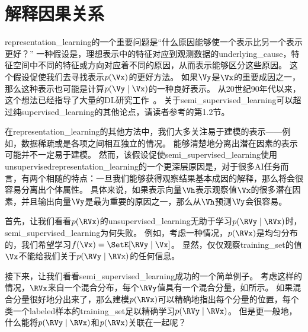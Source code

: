 
\section{解释因果关系}
\label{sec:semi_supervised_disentangling_of_causal_factors}


\gls{representation_learning}的一个重要问题是``什么原因能够使一个表示比另一个表示更好？''
一种假设是，理想表示中的特征对应到观测数据的\gls{underlying_cause}，特征空间中不同的特征或方向对应着不同的原因，从而表示能够区分这些原因。
这个假设促使我们去寻找表示$p(\Vx)$的更好方法。
如果$\Vy$是$\Vx$的重要成因之一，那么这种表示也可能是计算$p(\Vy \mid \Vx)$的一种良好表示。
从20世纪90年代以来，这个想法已经指导了大量的\gls{DL}研究工作~\citep{Becker92,hinton1999unsupervised}。
关于\gls{semi_supervised_learning}可以超过纯\gls{supervised_learning}的其他论点，请读者参考\cite{Chapelle-2006}的第1.2节。


在\gls{representation_learning}的其他方法中，我们大多关注易于建模的表示——例如，数据稀疏或是各项之间相互独立的情况。
能够清楚地分离出潜在因素的表示可能并不一定易于建模。
然而，该假设促使\gls{semi_supervised_learning}使用\gls{unsupervised}\gls{representation_learning}的一个更深层原因是，对于很多\gls{AI}任务而言，有两个相随的特点：一旦我们能够获得观察结果基本成因的解释，那么将会很容易分离出个体属性。
具体来说，如果表示向量$\Vh$表示观察值$\Vx$的很多潜在因素，并且输出向量$\Vy$是最为重要的原因之一，那么从$\Vh$预测$\Vy$会很容易。


首先，让我们看看$p(\RVx)$的\gls{unsupervised_learning}无助于学习$p(\RVy\mid\RVx)$时，\gls{semi_supervised_learning}为何失败。
例如，考虑一种情况，$p(\RVx)$是均匀分布的，我们希望学习$f(\Vx) = \SetE[\RVy \mid \Vx]$。
显然，仅仅观察\gls{training_set}的值$\Vx$不能给我们关于$p(\RVy \mid \RVx)$的任何信息。


接下来，让我们看看\gls{semi_supervised_learning}成功的一个简单例子。
考虑这样的情况，$\RVx$来自一个混合分布，每个$\RVy$值具有一个混合分量，如所示。
如果混合分量很好地分出来了，那么建模$p(\RVx)$可以精确地指出每个分量的位置，每个类一个\gls{labeled}样本的\gls{training_set}足以精确学习$p(\RVy \mid \RVx)$。
但是更一般地，什么能将$p(\RVy \mid \RVx)$和$p(\RVx)$关联在一起呢？


